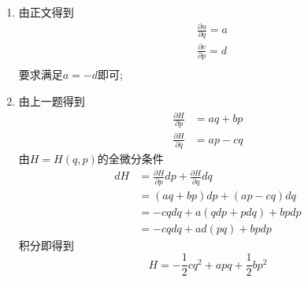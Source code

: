 \begin{solution}
    \begin{enumerate}[label=(\arabic*)]
        \item 由正文得到
        \begin{align*}
            &\frac{\partial u}{\partial q}=a\\
            &\frac{\partial v}{\partial p}=d\\
        \end{align*}
        要求满足$a=-d$即可;
        \item 由上一题得到
        \begin{align*}
            \frac{\partial H}{\partial p}&=aq+bp\\
            \frac{\partial H}{\partial q}&=ap-cq
        \end{align*}
        由$H=H(q,p)$的全微分条件
        \begin{align*}
            dH&=\frac{\partial H}{\partial p}dp+\frac{\partial H}{\partial q}dq\\
              &=(aq+bp)dp+(ap-cq)dq\\
              &=-cqdq+a(qdp+pdq)+bpdp\\
              &=-cqdq+ad(pq)+bpdp
        \end{align*}
        积分即得到
        $$H=-\frac12 cq^2+apq+\frac12 b p^2$$
    \end{enumerate}
\end{solution}
